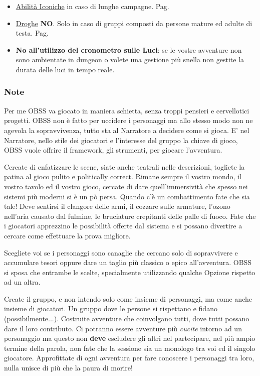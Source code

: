 \begin{itemize}[leftmargin=*]
\item
\hyperlink{abilitaiconiche}{Abilità Iconiche} in caso di lunghe campagne. Pag. \pageref{abilitaiconiche}

\item
\hyperlink{droghe}{Droghe} \textbf{NO}. Solo in caso di gruppi composti da persone mature ed adulte di testa. Pag. \pageref{droghe}

\item
\textbf{No all'utilizzo del cronometro sulle Luci}: se le vostre avventure non sono ambientate in dungeon o volete una gestione più snella non gestite la durata delle luci in tempo reale.

\end{itemize}


\vfill
{\small

\begin{multicols}{2}

\subsubsection*{Note}

Per me OBSS va giocato in maniera schietta, senza troppi pensieri e cervellotici progetti. OBSS non è fatto per uccidere i personaggi ma allo stesso modo non ne agevola la sopravvivenza, tutto sta al Narratore a decidere come si gioca. E' nel Narratore, nello stile dei giocatori e l'interesse del gruppo la chiave di gioco, OBSS vuole offrire il framework, gli strumenti, per giocare l'avventura.

Cercate di enfatizzare le scene, siate anche teatrali nelle descrizioni, togliete la patina al gioco pulito e politically correct. Rimane sempre il vostro mondo, il vostro tavolo ed il vostro gioco, cercate di dare quell'immersività che spesso nei sistemi più moderni si è un pò persa.
Quando c'è un combattimento fate che sia tale! Deve sentirsi il clangore delle armi, il cozzare sulle armature, l'ozono nell'aria causato dal fulmine, le bruciature crepitanti delle palle di fuoco. Fate che i giocatori apprezzino le possibilità offerte dal sistema e si possano divertire a cercare come effettuare la prova migliore.

Scegliete voi se i personaggi sono canaglie che cercano solo di sopravvivere e accumulare tesori oppure dare un taglio più classico o epico all'avventura. OBSS si sposa che entrambe le scelte, specialmente utilizzando qualche Opzione rispetto ad un altra.

Create il gruppo, e non intendo solo come insieme di personaggi, ma come anche insieme di giocatori. Un gruppo dove le persone si rispettano e fidano (possibilmente...). Costruite avventure che coinvolgano tutti, dove tutti possano dare il loro contributo. Ci potranno essere avventure più \emph{cucite} intorno ad un personaggio ma questo non \textbf{deve} escludere gli altri nel partecipare, nel più ampio termine della parola, non fate che la sessione sia un monologo tra voi ed il singolo giocatore.
Approfittate di ogni avventura per fare conoscere i personaggi tra loro, nulla unisce di più che la paura di morire!


\end{multicols}}
